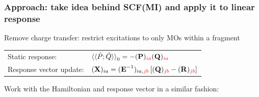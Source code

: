\documentclass[%
    xcolor=usenames,dvipsnames,svgnames%
]{beamer}
\begin{document}
\begin{frame}
  \frametitle{Approach: take idea behind SCF(MI) and apply it to linear response}
  Remove charge transfer: restrict excitations to only MOs within a fragment
  \begin{table}
    \centering
    \begin{tabular}{ll}
      Static response: & \(\braket{\braket{\hat{P};\hat{Q}}}_{0} = -(\boldsymbol{\mathbf{P}})_{\textcolor{red}{ia}}(\boldsymbol{\mathbf{Q}})_{\textcolor{red}{ia}}\) \\
      Response vector update: & \((\boldsymbol{\mathbf{X}})_{ia} = (\boldsymbol{\mathbf{E}}^{-1})_{ia,\textcolor{red}{jb}} \left[ (\boldsymbol{\mathbf{Q}})_{\textcolor{red}{jb}} - (\boldsymbol{\mathbf{R}})_{\textcolor{red}{jb}} \right]\)
    \end{tabular}
  \end{table}
  Work with the Hamiltonian and response vector in a similar fashion:
  \begin{table}
    \centering
    \begin{tabular}{ccc}

\end{tabular}
\end{table}
\end{frame}
\end{document}
